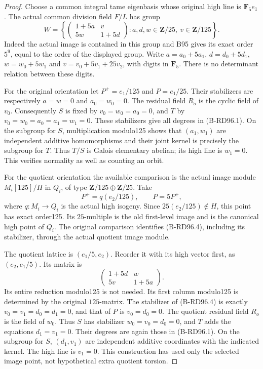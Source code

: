 \begin{proof}
Choose a common integral tame eigenbasis whose original high line is
$\mathbf F_5e_1$. The actual common division field $F/L$ has group
\[
 W=\left\{\begin{pmatrix}1+5a&v\\5w&1+5d\end{pmatrix}:
 a,d,w\in\mathbf Z/25,\ v\in\mathbf Z/125\right\}.
                                                        \tag{B-RD96.3}
\]
Indeed the actual image is contained in this group and B95 gives
its exact order $5^9$, equal to the order of the displayed group.
Write $a=a_0+5a_1$, $d=d_0+5d_1$, $w=w_0+5w_1$ and
$v=v_0+5v_1+25v_2$, with digits in $\mathbf F_5$.
There is no determinant relation between these digits.

For the original orientation let $P^+=e_1/125$ and $P=e_1/25$.
Their stabilizers are respectively $a=w=0$ and $a_0=w_0=0$.
The residual field $R_o$ is the cyclic field of $v_0$.
Consequently $S$ is fixed by $v_0=w_0=a_0=0$, and $T$ by
$v_0=w_0=a_0=a_1=w_1=0$. These stabilizers give all degrees
in (B-RD96.1). On the subgroup for $S$, multiplication modulo125
shows that $(a_1,w_1)$ are independent additive homomorphisms
and their joint kernel is precisely the subgroup for $T$.
Thus $T/S$ is Galois elementary abelian; its high line is $w_1=0$.
This verifies normality as well as counting an orbit.

For the quotient orientation the available comparison is the actual
image module $M_i[125]/H$ in $Q_i$, of type
$\mathbf Z/125\oplus\mathbf Z/25$. Take
\[
                   P^+=q(e_2/125),\qquad P=5P^+,
                                                        \tag{B-RD96.4}
\]
where $q:M_i\longrightarrow Q_i$ is the actual high isogeny.
Since $25(e_2/125)\notin H$, this point has exact order125.
Its $25$-multiple is the old first-level image and is the canonical
high point of $Q_i$. The original comparison identifies (B-RD96.4),
including its stabilizer, through the actual quotient image module.

The quotient lattice is $(e_1/5,e_2)$. Reorder it with its high
vector first, as $(e_2,e_1/5)$. Its matrix is
\[
                   \begin{pmatrix}1+5d&w\\5v&1+5a\end{pmatrix}.
                                                        \tag{B-RD96.5}
\]
Its entire reduction modulo125 is not needed. Its first column
modulo125 is determined by the original $125$-matrix. The stabilizer
of (B-RD96.4) is exactly $v_0=v_1=d_0=d_1=0$, and that of $P$
is $v_0=d_0=0$. The quotient residual field $R_o$ is the field
of $w_0$. Thus $S$ has stabilizer $w_0=v_0=d_0=0$, and $T$
adds the equations $d_1=v_1=0$. Their degrees are again those
in (B-RD96.1). On the subgroup for $S$, $(d_1,v_1)$ are
independent additive coordinates with the indicated kernel.
The high line is $v_1=0$. This construction has used only the
selected image point, not hypothetical extra quotient torsion.


\end{proof}

